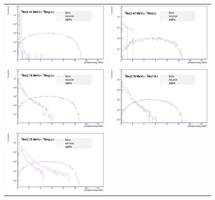 \documentclass{JINST}
\begin{document}
\begin{figure}[htp]

  \centering

  

  \begin{tabular}{cc}


    \includegraphics[width=60mm]{a_n_beta_spect_c2.eps}&

    \includegraphics[width=60mm]{a_n_beta_spect_c3.eps}\\

    \includegraphics[width=60mm]{a_n_beta_spect_c4.eps}&

    \includegraphics[width=60mm]{a_n_beta_spect_c5.eps}\\

      \includegraphics[width=60mm]{a_n_beta_spect_c6.eps}&


\end{tabular}
\end{figure}
\end{document}
